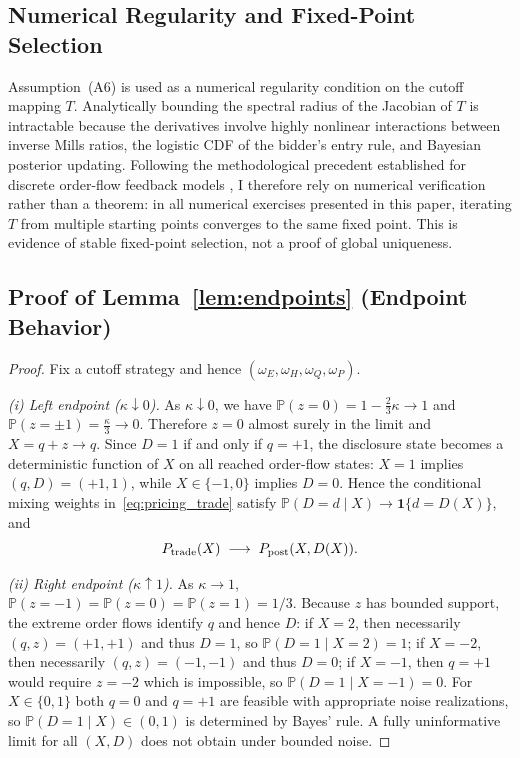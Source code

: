 \documentclass[11pt]{article}
\newcommand{\PP}{\mathbb{P}}
\newcommand{\1}{\mathbf{1}}
\begin{document}
\subsection{Numerical Regularity and Fixed-Point Selection}
\label{app:proof-uniqueness}

Assumption~\textup{(A6)} is used as a numerical regularity condition on the cutoff mapping $T$. Analytically bounding the spectral radius of the Jacobian of $T$ is intractable because the derivatives involve highly nonlinear interactions between inverse Mills ratios, the logistic CDF of the bidder's entry rule, and Bayesian posterior updating. Following the methodological precedent established for discrete order-flow feedback models \citep{EdmansGoldsteinJiang2015}, I therefore rely on numerical verification rather than a theorem: in all numerical exercises presented in this paper, iterating $T$ from multiple starting points converges to the same fixed point. This is evidence of stable fixed-point selection, not a proof of global uniqueness.

\subsection{Proof of Lemma~\ref{lem:endpoints} (Endpoint Behavior)}
\label{app:proof-endpoints}

\begin{proof}
Fix a cutoff strategy and hence $(\omega_E,\omega_H,\omega_Q,\omega_P)$.

\textit{(i) Left endpoint ($\kappa\downarrow 0$).}
As $\kappa\downarrow 0$, we have $\PP(z=0)=1-\frac{2}{3}\kappa\to 1$ and $\PP(z=\pm 1)=\frac{\kappa}{3}\to 0$. Therefore $z=0$ almost surely in the limit and $X=q+z\to q$. Since $D=1$ if and only if $q=+1$, the disclosure state becomes a deterministic function of $X$ on all reached order-flow states: $X=1$ implies $(q,D)=(+1,1)$, while $X\in\{-1,0\}$ implies $D=0$. Hence the conditional mixing weights in~\eqref{eq:pricing_trade} satisfy $\PP(D=d\mid X)\to \1\{d=D(X)\}$, and
\[
P_{\textup{trade}}(X)\;\longrightarrow\;P_{\textup{post}}(X,D(X)).
\]

\textit{(ii) Right endpoint ($\kappa\uparrow 1$).}
As $\kappa\to 1$, $\PP(z=-1)=\PP(z=0)=\PP(z=1)=1/3$. Because $z$ has bounded support, the extreme order flows identify $q$ and hence $D$: if $X=2$, then necessarily $(q,z)=(+1,+1)$ and thus $D=1$, so $\PP(D=1\mid X=2)=1$; if $X=-2$, then necessarily $(q,z)=(-1,-1)$ and thus $D=0$; if $X=-1$, then $q=+1$ would require $z=-2$ which is impossible, so $\PP(D=1\mid X=-1)=0$. For $X\in\{0,1\}$ both $q=0$ and $q=+1$ are feasible with appropriate noise realizations, so $\PP(D=1\mid X)\in(0,1)$ is determined by Bayes' rule. A fully uninformative limit for all $(X,D)$ does not obtain under bounded noise.
\end{proof}
\end{document}
